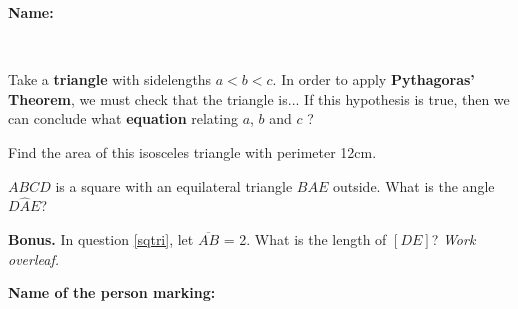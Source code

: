 \documentclass[12pt]{exam}
\begin{document}
\textbf{Name:} \dotfill

\
\begin{questions}


\question[2] Take a \textbf{triangle} with sidelengths $a < b < c$. In order to apply \textbf{Pythagoras' Theorem}, we must check that the triangle is...
\fillwithdottedlines{7mm}
If this hypothesis is true, then we can conclude what \textbf{equation} relating $a$, $b$ and $c$ ?
\fillwithdottedlines{7mm}

\question[4] Find the area of this isosceles triangle with perimeter 12cm.
\vspace{-5mm}

\begin{minipage}{0.8\textwidth}
\vspace{3mm}
\fillwithdottedlines{55mm}
\end{minipage}
\begin{minipage}{0.2\textwidth}
\begin{center}




\end{center}
\end{minipage}

\question[4] \label{sqtri} $ABCD$ is a square with an equilateral triangle $BAE$ outside. What is the angle $D\hat{A}E$?
\fillwithdottedlines{\stretch{1}}



\question \textbf{Bonus.} In question \ref{sqtri}, let $\overline{AB}$ = 2. What is the length of $[DE]$? \hfill \emph{Work overleaf.}

\end{questions}

\begin{tcolorbox}

\textbf{Name of the person marking:}

\begin{center}
\gradetable[h][questions]
\end{center}

\end{tcolorbox}
\end{document}
